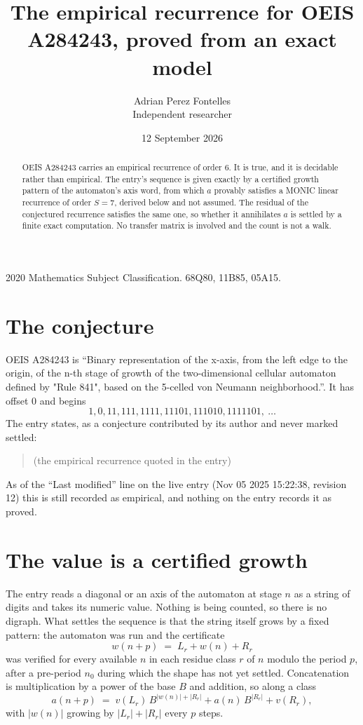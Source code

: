 \documentclass[11pt,a4paper]{article}
\title{The empirical recurrence for OEIS A284243, proved from an exact model}
\author{Adrian Perez Fontelles\\ \small Independent researcher}
\date{12 September 2026}
\theoremstyle{plain}
\theoremstyle{definition}
\begin{document}
\maketitle

\begin{abstract}
OEIS A284243 carries an empirical recurrence of order $6$. It is true, and it is
decidable rather than empirical. The entry's sequence is given exactly by a certified growth pattern of the automaton's axis word, from
which $a$ provably satisfies a MONIC linear recurrence of order $S=7$, derived below and not
assumed. The residual of the conjectured recurrence satisfies the same one, so whether it
annihilates $a$ is settled by a finite exact computation. No transfer matrix is involved and
the count is not a walk.
\end{abstract}

\noindent\small 2020 Mathematics Subject Classification. 68Q80, 11B85, 05A15.\normalsize

\section{The conjecture}

OEIS A284243 is ``Binary representation of the x-axis, from the left edge to the origin, of the n-th stage of growth of the two-dimensional cellular automaton defined by "Rule 841", based on the 5-celled von Neumann neighborhood.''. It has offset $0$ and begins
\[
1, 0, 11, 111, 1111, 11101, 111010, 1111101,\ \dots
\]
The entry states, as a conjecture contributed by its author and never marked settled:
\begin{quote}
(the empirical recurrence quoted in the entry)
\end{quote}
As of the ``Last modified'' line on the live entry (Nov 05 2025 15:22:38, revision 12)
this is still recorded as empirical, and nothing on the entry records it as proved.

\section{The value is a certified growth}

The entry reads a diagonal or an axis of the automaton at stage $n$ as a string of digits and takes its
numeric value. Nothing is being counted, so there is no digraph. What settles the sequence is
that the string itself grows by a fixed pattern: the automaton was run and the certificate
\[
w(n+p)\;=\;L_r + w(n) + R_r
\]
was verified for every available $n$ in each residue class $r$ of $n$ modulo the period $p$,
after a pre-period $n_0$ during which the shape has not yet settled. Concatenation is
multiplication by a power of the base $B$ and addition, so along a class
\[
a(n+p)\;=\;v(L_r)\,B^{|w(n)|+|R_r|} + a(n)\,B^{|R_r|} + v(R_r),
\]
with $|w(n)|$ growing by $|L_r|+|R_r|$ every $p$ steps.
\end{document}

